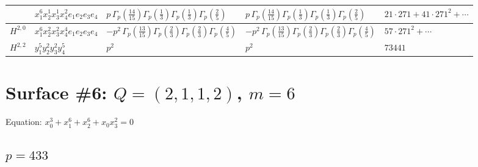 \documentclass[11pt]{article}
\begin{document}
\begin{table}[ht]
{\begin{tabular}{@{}lllll@{}}
 & $x_{1}^{6} x_{2}^{1} x_{3}^{1} x_{4}^{2}  e_{1} e_{2} e_{3} e_{4}$ & $p \, \Gamma_p \left( \frac{14}{15} \right) \Gamma_p \left( \frac{1}{3} \right) \Gamma_p \left( \frac{1}{3} \right) \Gamma_p \left( \frac{2}{5} \right)$ & $p \, \Gamma_p \left( \frac{14}{15} \right) \Gamma_p \left( \frac{1}{3} \right) \Gamma_p \left( \frac{1}{3} \right) \Gamma_p \left( \frac{2}{5} \right)$ & $21{\cdot}271{+}41{\cdot}271^{2}{+}\cdots$ \\
\midrule
$H^{2,0}$ & $x_{1}^{6} x_{2}^{2} x_{3}^{2} x_{4}^{4}  e_{1} e_{2} e_{3} e_{4}$ & $- p^{2} \, \Gamma_p \left( \frac{13}{15} \right) \Gamma_p \left( \frac{2}{3} \right) \Gamma_p \left( \frac{2}{3} \right) \Gamma_p \left( \frac{4}{5} \right)$ & $- p^{2} \, \Gamma_p \left( \frac{13}{15} \right) \Gamma_p \left( \frac{2}{3} \right) \Gamma_p \left( \frac{2}{3} \right) \Gamma_p \left( \frac{4}{5} \right)$ & $57{\cdot}271^{2}{+}\cdots$ \\
\midrule
$H^{2,2}$ & $y_{1}^{5} y_{2}^{2} y_{3}^{2} y_{4}^{5}$ & $p^{2} \,$ & $p^{2} \,$ & $73441$ \\
\bottomrule
\end{tabular}
}
\renewcommand{\arraystretch}{1.0}
\end{table}

\newpage

\section*{Surface \#6: $Q=(2, 1, 1, 2)$, $m=6$}

Equation: $x_0^{3} + x_1^{6} + x_2^{6} + x_0 x_3^{2} = 0$

\subsection*{$p = 433$}
\end{document}
